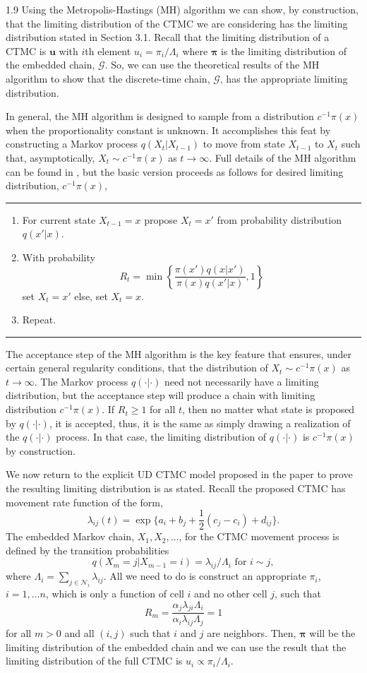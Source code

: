 \documentclass[12pt]{article}
\newcommand{\bu}{\ensuremath{\mathbf{u}}}
\newcommand{\bpi}{\ensuremath{\boldsymbol{\pi}}}
\newcommand{\fN}{\ensuremath{\mathcal{N}}}
\newcommand{\fG}{\ensuremath{\mathcal{G}}}
\begin{document}
\begin{spacing}{1.9}
Using the Metropolis-Hastings (MH) algorithm we can show, by construction, that the limiting distribution of the CTMC we are considering has the limiting distribution stated in Section 3.1. Recall that the limiting distribution of a CTMC is $\bu$ with $i$th element $u_i = \pi_i/\Lambda_i$ where $\bpi$ is the limiting distribution of the embedded chain, $\fG$. So, we can use the theoretical results of the MH algorithm to show that the discrete-time chain, $\fG$, has the appropriate limiting distribution. 

In general, the MH algorithm is designed to sample from a distribution $c^{-1}\pi(x)$ when the proportionality constant is unknown. It accomplishes this feat by constructing a Markov process $q(X_t|X_{t-1})$ to move from state $X_{t-1}$ to $X_t$ such that, asymptotically, $X_t \sim c^{-1}\pi(x)$ as $t\to \infty$. Full details of the MH algorithm can be found in \cite{chib1995understanding}, but the basic version proceeds as follows for desired limiting distribution, $c^{-1}\pi(x)$, \bigskip
\hrule
\begin{enumerate}
\item For current state $X_{t-1} = x$ propose $X_t = x'$ from probability distribution $q(x'|x)$.
\item With probability 
\[
R_t = \min \left\{ \frac{\pi(x')q(x|x')}{\pi(x)q(x'|x)}, 1 \right\}
\]
set $X_t = x'$ else, set $X_t = x$. 
\item Repeat. 
\end{enumerate}
\hrule \bigskip
The acceptance step of the MH algorithm is the key feature that ensures, under certain general regularity conditions, that the distribution of $X_t \sim c^{-1}\pi(x)$ as $t\to \infty$. The Markov process $q(\cdot|\cdot)$ need not necessarily have a limiting distribution, but the acceptance step will produce a chain with limiting distribution $c^{-1}\pi(x)$. If $R_t \ge 1$ for all $t$, then no matter what state is proposed by $q(\cdot|\cdot)$, it is accepted, thus, it is the same as simply drawing a realization of the $q(\cdot|\cdot)$ process. In that case, the limiting distribution of $q(\cdot|\cdot)$ is $c^{-1}\pi(x)$ by construction.

We now return to the explicit UD CTMC model proposed in the paper to prove the resulting limiting distribution is as stated. Recall the proposed CTMC has movement rate function of the form,
\[
\lambda_{ij}(t) = \exp\{a_i + b_j + \frac{1}{2}(c_{j}-c_i) + d_{ij}\}.
\]
The embedded Markov chain, $X_1,X_2,\dots$, for the CTMC movement process is defined by the transition probabilities 
\[
q(X_m=j|X_{m-1}=i) = \lambda_{ij}/ \Lambda_i \text{ for } i \sim j,
\]
where $\Lambda_i = \sum_{j\in\fN_i}\lambda_{ij}$. All we need to do is construct an appropriate $\pi_i$, $i=1,\dots n$, which is only a function of cell $i$ and no other cell $j$, such that
\[
R_m = \frac{\alpha_j\lambda_{ji}\Lambda_i}{\alpha_i\lambda_{ij}\Lambda_j} = 1 
\]
for all $m>0$ and all $(i,j)$ such that $i$ and $j$ are neighbors. Then, $\bpi$ will be the limiting distribution of the embedded chain and we can use the result that the limiting distribution of the full CTMC is $u_i \propto \pi_i/\Lambda_i$.


\end{spacing}
\end{document}
